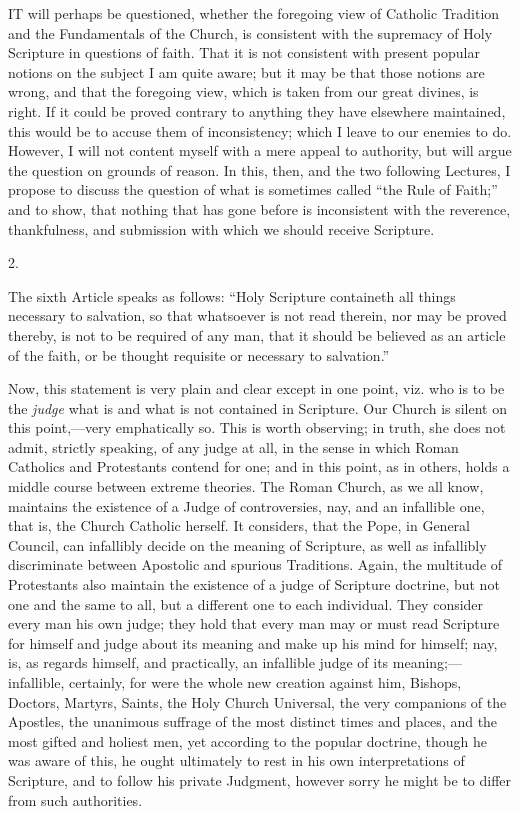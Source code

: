 IT will perhaps be questioned, whether
the foregoing view of Catholic Tradition and the Fundamentals of the
Church, is consistent with the supremacy of Holy Scripture in
questions of faith. That it is not consistent with present popular
notions on the subject I am quite aware; but it may be that those
notions are wrong, and that the foregoing view, which is taken from
our great divines, is right. If it could be proved contrary to
anything they have elsewhere maintained, this would be to accuse them
of inconsistency; which I leave to our enemies to do. However, I will
not content myself with a mere appeal to authority, but will argue the
question on grounds of reason. In this, then, and the two following
Lectures, I propose to discuss the question of what is sometimes
called ``the Rule of Faith;'' and to show, that nothing that
has gone before is inconsistent with the reverence, thankfulness, and
submission with which we should receive Scripture.

2.

The sixth Article speaks as follows: ``Holy Scripture
containeth all things necessary to salvation, so that whatsoever is
not read therein, nor may be proved thereby, is not to be required of
any man, that it should be believed as an article of the faith,
or be thought requisite or necessary to salvation.''

Now, this statement is very plain and clear except in one point,
viz. who is to be the \emph{judge} what is and what is not contained
in Scripture. Our Church is silent on this point,—very emphatically
so. This is worth observing; in truth, she does not admit, strictly
speaking, of any judge at all, in the sense in which Roman Catholics
and Protestants contend for one; and in this point, as in others,
holds a middle course between extreme theories. The Roman Church, as
we all know, maintains the existence of a Judge of controversies, nay,
and an infallible one, that is, the Church Catholic herself. It
considers, that the Pope, in General Council, can infallibly decide on
the meaning of Scripture, as well as infallibly discriminate between
Apostolic and spurious Traditions. Again, the multitude of Protestants
also maintain the existence of a judge of Scripture doctrine, but not
one and the same to all, but a different one to each individual. They
consider every man his own judge; they hold that every man may or must
read Scripture for himself and judge about its meaning and make up his
mind for himself; nay, is, as regards himself, and practically, an
infallible judge of its meaning;—infallible, certainly, for were the
whole new creation against him, Bishops, Doctors, Martyrs, Saints, the
Holy Church Universal, the very companions of the Apostles, the
unanimous suffrage of the most distinct times and places, and the most
gifted and holiest men, yet according to the popular doctrine, though
he was aware of this, he ought ultimately to rest in his own
interpretations of Scripture, and to follow his private Judgment,
however sorry he might be to differ from such authorities.


